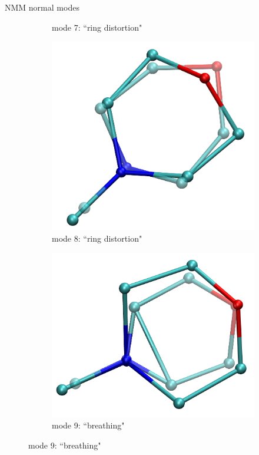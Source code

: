 \documentclass{beamer}
\begin{document}
\begin{frame}{NMM normal modes}
\begin{figure}
\begin{subfigure}{\x\textwidth}
			\caption{mode 7: ``ring distortion"}
		\end{subfigure}
		\begin{subfigure}{\x\textwidth}
		\includegraphics[width=\textwidth]{mode8_ot.png}
		\caption{mode 8: ``ring distortion"}
		\end{subfigure}
		\begin{subfigure}{\x\textwidth}
			\includegraphics[width=\textwidth]{mode9_ot.png}
			\caption{mode 9: ``breathing"}
		\end{subfigure}
	\end{figure}
\end{frame}
\end{document}
